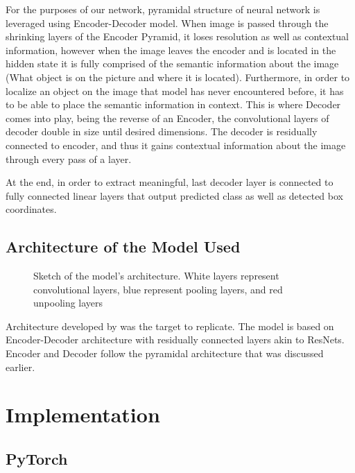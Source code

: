For the purposes of our network, pyramidal structure of neural network is leveraged using
Encoder-Decoder model. When image is passed through the shrinking layers of the Encoder
Pyramid, it loses resolution as well as contextual information, however when the image
leaves the encoder and is located in the hidden state it is fully comprised of
the semantic information about the image (What object is on the picture and where it is
located). Furthermore, in order to localize an object on the image that model has never 
encountered before, it has to be able to place the semantic information in context. 
This is where Decoder comes into play, being the reverse of an Encoder, the convolutional
layers of decoder double in size until desired dimensions. The decoder is residually
connected to encoder, and thus it gains contextual information about the image through
every pass of a layer.

At the end, in order to extract meaningful, last decoder layer is connected
to fully connected linear layers that  output predicted class as well as
detected box coordinates.





\subsection{Architecture of the Model Used}

\begin{figure}[h]
	\begin{center}
	
	\end{center}
	\caption{Sketch of the model's architecture. White layers represent convolutional layers,
	blue represent pooling layers, and red unpooling layers}
\end{figure}

Architecture developed by  was the target to replicate. The model is based
on Encoder-Decoder architecture with residually connected layers akin to ResNets. Encoder and 
Decoder follow the pyramidal architecture that was discussed earlier. 




\section{Implementation}

\subsection{PyTorch}

